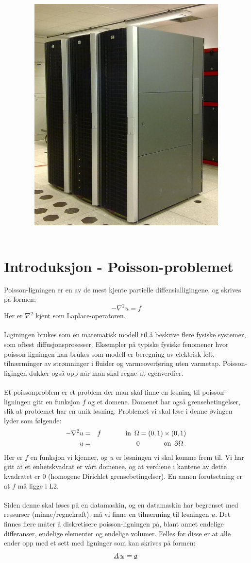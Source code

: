 \documentclass{article}
\title{
\vspace*{\stretch{1}}
\noindent\HRule
\begin{center}
 \Huge
 \noindent	\exerciseClass \\
 \noindent \exerciseTitle \\ [4mm]
 \large
 \noindent\emph{\exerciseGroupMembers}
\noindent\HRule \newline
\end{center}
\vspace{0cm}
\begin{center}
	\includegraphics[width=10cm]{img/kongull.jpg}
\end{center}
\vspace*{\stretch{3}}
\begin{center}
\end{center}
}
\newcommand{\ub}[1]{\underbar{$#1$}\,}
\begin{document}
\pagestyle{empty}
\maketitle

\thispagestyle{empty}

\newpage \tableofcontents


\newpage


\section{Introduksjon - Poisson-problemet}
Poisson-ligningen er en av de mest kjente partielle diffensialligingene, og skrives på formen:
\begin{equation}
	-\nabla^2 u = f
\end{equation}
Her er $\nabla^2$ kjent som Laplace-operatoren.\\
\\
Liginingen brukes som en matematisk modell til å beskrive flere fysiske systemer, som oftest diffusjonsprosesser. Eksempler på typiske fysiske fenomener hvor poisson-ligningen kan brukes som modell er beregning av elektrisk felt, tilnærminger av strømninger i fluider og varmeoverføring uten varmetap. Poisson-ligingen dukker også opp når man skal regne ut egenverdier.\\
\\
Et poissonproblem er et problem der man skal finne en løsning til poisson-ligningen gitt en funksjon $f$ og et domene. Domenet har også grensebetingelser, slik at problemet har en unik løsning. Problemet vi skal løse i denne øvingen lyder som følgende:
\begin{eqnarray}
	-\nabla^2 u & = & f \hspace{.5in} \textrm{in} \,\,\, \Omega = (0,1)\times (0,1) \\
	u & = & 0 \hspace{.5in} \textrm{on} \,\,\, \partial\Omega\, .
\end{eqnarray}
Her er $f$ en funksjon vi kjenner,  og $u$ er løsningen vi skal komme frem til. Vi har gitt at et enhetskvadrat  er vårt domenee, og at verdiene i kantene av dette kvadratet er $0$ (homogene Dirichlet grensebetingelser). En annen forutsetning er at $f$ må ligge i L2.\\
\\
Siden denne skal løses på en datamaskin, og en datamaskin har begrenset med ressurser (minne/regnekraft), må vi finne en tilnærming til løsningen $u$. Det finnes flere måter å diskretisere poisson-ligningen på, blant annet endelige differanser, endelige elementer og endelige volumer. Felles for disse er at alle ender opp med et sett med ligninger som kan skrives på formen:
\begin{equation}
	\label{eq:linear-system}
  \ub{A} \ub{u} = \ub{g}
\end{equation}
\end{document}
